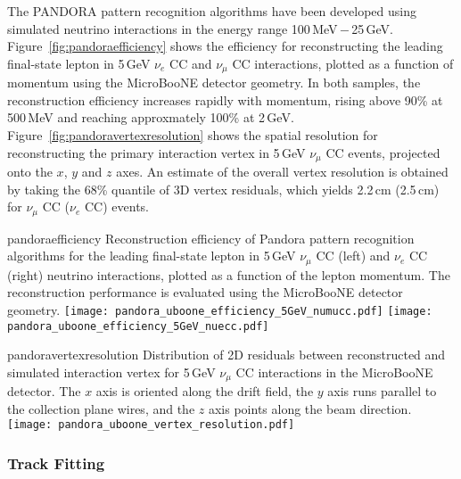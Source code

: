 The PANDORA pattern recognition algorithms have been developed
using simulated neutrino interactions in the energy range 100\,MeV\,$-$\,25\,GeV.
Figure~\ref{fig:pandoraefficiency} shows the efficiency for reconstructing
the leading final-state lepton in 5\,GeV $\nu_{e}$ CC and $\nu_{\mu}$ CC interactions,
plotted as a function of momentum using the MicroBooNE detector geometry.
In both samples, the reconstruction efficiency increases rapidly with momentum,
rising above 90\% at 500\,MeV and reaching approxmately 100\% at 2\,GeV.
Figure~\ref{fig:pandoravertexresolution} shows the spatial resolution for
reconstructing the primary interaction vertex in 5\,GeV $\nu_{\mu}$ CC events,
projected onto the $x$, $y$ and $z$ axes. An estimate of the overall vertex 
resolution is obtained by taking the 68\% quantile of 3D vertex residuals, 
which yields 2.2\,cm (2.5\,cm) for $\nu_{\mu}$ CC ($\nu_{e}$ CC) events.


\begin{cdrfigure}{pandoraefficiency}
{Reconstruction efficiency of Pandora pattern recognition algorithms
 for the leading final-state lepton in 5\,GeV $\nu_{\mu}$ CC (left) and
 $\nu_{e}$ CC (right) neutrino interactions, plotted as a function of
 the lepton momentum. The reconstruction performance is evaluated
 using the MicroBooNE detector geometry. }
\texttt{[image: pandora\_uboone\_efficiency\_5GeV\_numucc.pdf]}
\texttt{[image: pandora\_uboone\_efficiency\_5GeV\_nuecc.pdf]}
\end{cdrfigure}

\begin{cdrfigure}{pandoravertexresolution}
{Distribution of 2D residuals between reconstructed and simulated interaction
 vertex for 5\,GeV $\nu_{\mu}$ CC interactions in the MicroBooNE detector.
 The $x$ axis is oriented along the drift field, the $y$ axis runs parallel 
 to the collection plane wires, and the $z$ axis points along the beam direction.}
\texttt{[image: pandora\_uboone\_vertex\_resolution.pdf]}
\end{cdrfigure}


\subsubsection{Track Fitting}


